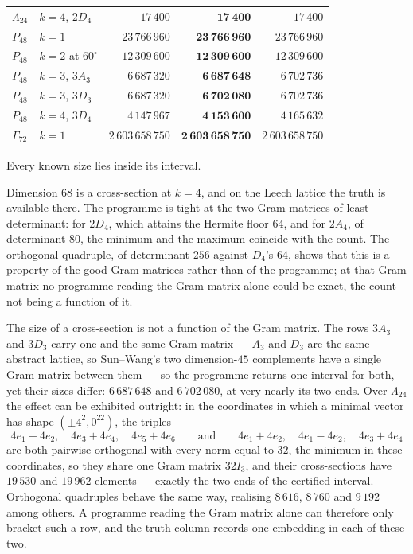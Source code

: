 \documentclass[11pt]{amsart}
\theoremstyle{remark}
\newcommand{\Leech}{\Lambda_{24}}
\newcommand{\Pff}{P_{48}}
\newcommand{\Gsz}{\Gamma_{72}}
\begin{document}
\begin{table}[ht]
\begin{tabular}{llrrr}
$\Leech$ & $k=4$, $2D_4$           & $17\,400$ & $\mathbf{17\,400}$ & $17\,400$ \\
$\Pff$   & $k=1$                   & $23\,766\,960$ & $\mathbf{23\,766\,960}$ & $23\,766\,960$ \\
$\Pff$   & $k=2$ at $60^\circ$     & $12\,309\,600$ & $\mathbf{12\,309\,600}$ & $12\,309\,600$ \\
$\Pff$   & $k=3$, $3A_3$           & $6\,687\,320$ & $\mathbf{6\,687\,648}$ & $6\,702\,736$ \\
$\Pff$   & $k=3$, $3D_3$           & $6\,687\,320$ & $\mathbf{6\,702\,080}$ & $6\,702\,736$ \\
$\Pff$   & $k=4$, $3D_4$           & $4\,147\,967$ & $\mathbf{4\,153\,600}$ & $4\,165\,632$ \\
$\Gsz$   & $k=1$                   & $2\,603\,658\,750$ & $\mathbf{2\,603\,658\,750}$ & $2\,603\,658\,750$ \\
\bottomrule
\end{tabular}
\end{table}

Every known size lies inside its interval.

Dimension $68$ is a cross-section at $k=4$, and on the Leech lattice the truth is
available there. The programme is tight at the two Gram matrices of least
determinant: for $2D_4$, which attains the Hermite floor $64$, and for $2A_4$, of
determinant $80$, the minimum and the maximum coincide with the count. The
orthogonal quadruple, of determinant $256$ against $D_4$'s $64$,
shows that this is a property of the good Gram matrices rather than of the
programme; at that Gram matrix no programme reading the Gram matrix alone could
be exact, the count not being a function of it.

The size of a cross-section is not a function of the Gram matrix. The rows $3A_3$
and $3D_3$ carry one and the same Gram matrix --- $A_3$ and $D_3$ are the same
abstract lattice, so Sun--Wang's two dimension-$45$ complements have a single Gram
matrix between them --- so the programme returns one interval for both, yet their
sizes differ:
$6\,687\,648$ and $6\,702\,080$, at very nearly its two ends.
Over $\Leech$ the effect can be exhibited outright: in the
coordinates in which a minimal vector has shape $(\pm4^2,0^{22})$, the triples
\[
  4e_1+4e_2,\quad 4e_3+4e_4,\quad 4e_5+4e_6
  \qquad\text{and}\qquad
  4e_1+4e_2,\quad 4e_1-4e_2,\quad 4e_3+4e_4
\]
are both pairwise orthogonal with every norm equal to $32$, the minimum in these
coordinates, so they share one Gram matrix $32I_3$, and their cross-sections have $19\,530$ and $19\,962$ elements ---
exactly the two ends of the certified interval. Orthogonal quadruples behave the
same way, realising $8\,616$, $8\,760$ and $9\,192$ among others. A programme
reading the Gram matrix alone can therefore only bracket such a row, and the
truth column records one embedding in each of these two.
\end{document}

